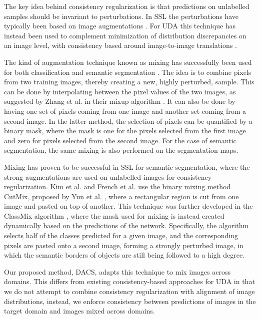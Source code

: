 \documentclass[10pt,twocolumn,letterpaper]{article}
\begin{document}
\vspace{0.4cm}
 The key idea behind consistency regularization is that predictions on unlabelled samples should be invariant to perturbations. In SSL the perturbations have typically been based on image augmentations \cite{French,ClassMix,berthelot2019mixmatch,xie2019unsupervised,FixMatch,StructuredLoss}. For UDA this technique has instead been used to complement minimization of distribution discrepancies on an image level, with consistency based around image-to-image translations \cite{chen2020crdoco, zhou2020uncertaintyaware}.

\vspace{0.4cm}
The kind of augmentation technique known as mixing has successfully been used for both classification and semantic segmentation \cite{MixUpOriginal,CutMix,berthelot2019mixmatch,French,MilkingCowMask,StructuredLoss,ClassMix,tokozume2018between}. The idea is to combine pixels from two training images, thereby creating a new, highly perturbed, sample. This can be done by interpolating between the pixel values of the two images, as suggested by Zhang et al. in their mixup algorithm \cite{MixUpOriginal}. It can also be done by having one set of pixels coming from one image and another set coming from a second image. 
In the latter method, the selection of pixels can be quantified by a binary mask, where the mask is one for the pixels selected from the first image and zero for pixels selected from the second image.
For the case of semantic segmentation, the same mixing is also performed on the segmentation maps.

Mixing has proven to be successful in SSL for semantic segmentation, where the strong augmentations are used on unlabelled images for consistency regularization. Kim et al. \cite{StructuredLoss} and French et al. \cite{French} use the binary mixing method CutMix, proposed by Yun et al. \cite{CutMix}, where a rectangular region is cut from one image and pasted on top of another. This technique was further developed in the ClassMix algorithm \cite{ClassMix}, where the mask used for mixing is instead created dynamically based on the predictions of the network. Specifically, the algorithm selects half of the classes predicted for a given image, and the corresponding pixels are pasted onto a second image, forming a strongly perturbed image, in which the semantic borders of objects are still being followed to a high degree.

Our proposed method, DACS, adapts this technique to mix images across domains. This differs from existing consistency-based approaches for UDA in that we do not attempt to combine consistency regularization with alignment of image distributions, instead, we enforce consistency between predictions of images in the target domain and images mixed across domains.
\end{document}

